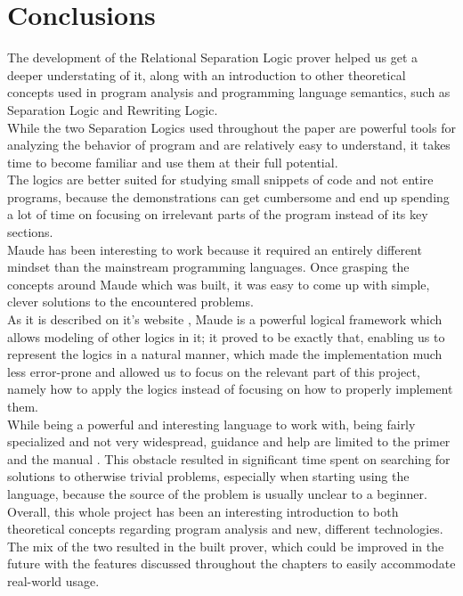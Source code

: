 \documentclass[12pt,a4paper]{article}
\begin{document}
{\section*{Conclusions}
The development of the Relational Separation Logic prover helped us get a deeper understating of it, along with an introduction to other theoretical concepts used in program analysis and programming language semantics, such as Separation Logic and Rewriting Logic.
\\

While the two Separation Logics used throughout the paper are powerful tools for analyzing the behavior of program and are relatively easy to understand, it takes time to become familiar and use them at their full potential.
\\

The logics are better suited for studying small snippets of code and not entire programs, because the demonstrations can get cumbersome and end up spending a lot of time on focusing on irrelevant parts of the program instead of its key sections. 
\\

Maude has been interesting to work because it required an entirely different mindset than the mainstream programming languages. Once grasping the concepts around Maude which was built, it was easy to come up with simple, clever solutions to the encountered problems. \\
As it is described on it's website \cite{maudesite}, Maude is a powerful logical framework which allows modeling of other logics in it; it proved to be exactly that, enabling us to represent the logics in a natural manner, which made the implementation much less error-prone and allowed us to focus on the relevant part of this project, namely how to apply the logics instead of focusing on how to properly implement them.
\\

While being a powerful and interesting language to work with, being fairly specialized and not very widespread, guidance and help are limited to the primer \cite{maudeprimer} and the manual \cite{manual}. This obstacle resulted in significant time spent on searching for solutions to otherwise trivial problems, especially when starting using the language, because the source of the problem is usually unclear to a beginner. 
\\

Overall, this whole project has been an interesting introduction to both  theoretical concepts regarding program analysis and new, different technologies. The mix of the two resulted in the built prover, which could be improved in the future with the features discussed throughout the chapters to easily accommodate real-world usage. 

}
\end{document}
